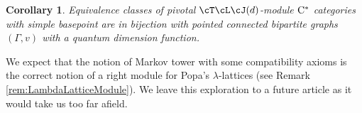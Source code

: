 \documentclass[11pt]{article}
\theoremstyle{plain}
\newtheorem{coralpha}[thmalpha]{Corollary}
\theoremstyle{definition}
\DeclareMathOperator{\tr}{tr}
\newcommand{\Cstar}{\rm{C^*}}
\begin{document}
\begin{coralpha}
\label{cor:TLJPivotalModuleClassification}
Equivalence classes of pivotal $\cT\cL\cJ(d)$-module $\Cstar$ categories with simple basepoint
are in bijection with 
pointed connected bipartite graphs $(\Gamma, v)$ with a quantum dimension function.
\end{coralpha}

We expect that the notion of Markov tower with some compatibility axioms is the correct notion of a right module for Popa's $\lambda$-lattices (see Remark \ref{rem:LambdaLatticeModule}).
We leave this exploration to a future article as it would take us too far afield.

\end{document}
